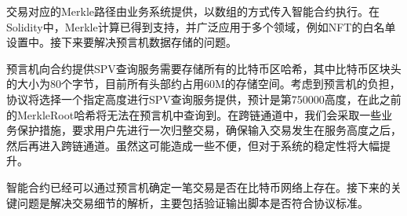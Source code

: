 \documentclass{article}
\begin{document}
\par 交易对应的Merkle路径由业务系统提供，以数组的方式传入智能合约执行。在Solidity中，Merkle计算已得到支持，并广泛应用于多个领域，例如NFT的白名单设置中。接下来要解决预言机数据存储的问题。
\par 预言机向合约提供SPV查询服务需要存储所有的比特币区哈希，其中比特币区块头的大小为80个字节，目前所有头部约占用60M的存储空间。考虑到预言机的负担，协议将选择一个指定高度进行SPV查询服务提供，预计是第750000高度，在此之前的MerkleRoot哈希将无法在预言机中查询到。在跨链通道中，我们会采取一些业务保护措施，要求用户先进行一次归整交易，确保输入交易发生在服务高度之后，然后再进入跨链通道。虽然这可能造成一些不便，但对于系统的稳定性将大幅提升。
\par 智能合约已经可以通过预言机确定一笔交易是否在比特币网络上存在。接下来的关键问题是解决交易细节的解析，主要包括验证输出脚本是否符合协议标准。
\end{document}
